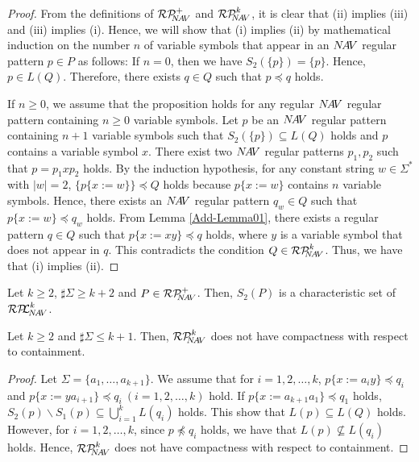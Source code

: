 \begin{proof}
From the definitions of $\mathcal{RP}^{+}_{\!\!\!N\!A\!V}$ and $\mathcal{RP}^{k}_{\!\!\!N\!A\!V}$, it is clear that (ii) implies (iii)  and  (iii) implies (i).
Hence, we will show that (i) implies (ii) 
by mathematical induction on the number $n$ of variable symbols that appear in an $N\!A\!V$ regular pattern $p\in P$ as follows:
If $n=0$, then we have $S_{2}(\{p\})= \{ p \}$.
Hence, $p \in L(Q)$.
Therefore, there exists $q \in Q$ such that $p \preceq q$ holds.

If $n \ge 0$, we assume that the proposition holds for any regular $N\!A\!V$ regular pattern containing $n \ge 0$ variable symbols.
Let $p$ be an $N\!A\!V$ regular pattern containing $n+1$ variable symbols such that $S_{2}(\{p\}) \subseteq L(Q)$ holds and $p$ contains a variable symbol $x$.
There exist two $N\!A\!V$ regular patterns $p_{1},p_{2}$ such that $p=p_{1}xp_{2}$ holds.
By the induction hypothesis, for any constant string $w\in \Sigma^{\ast}$ with $|w|=2$, $\{p\{x:=w\}\}\preceq Q$ holds because $p\{x:=w\}$ contains $n$ variable symbols.
Hence, there exists an $N\!A\!V$ regular pattern $q_{w} \in Q$ such that $p \{ x:=w \} \preceq q_{w}$ holds.
From Lemma \ref{Add-Lemma01}, %
there exists a regular pattern $q \in Q$ such that $p \{ x:=xy \} \preceq q$ holds, where $y$ is a variable symbol that does not appear in $q$.
This contradicts the condition $Q \in \mathcal{RP}^{k}_{\!\!\!N\!A\!V}$.
Thus, we have that (i) implies (ii).
\end{proof}

\begin{col}
Let $k\ge 2$, $\sharp\Sigma \ge k+2$ and $P \in \mathcal{RP}^{+}_{\!\!\!N\!A\!V}$.
Then, $S_{2}(P)$ is a characteristic set of $\mathcal{RP\!\!L}^{k}_{\!N\!A\!V}$.%
\end{col}

\begin{lem}\label{Case_k+2}%
Let $k\ge 2$ and $\sharp\Sigma \le k+1$.
Then, $\mathcal{RP}^{k}_{\!\!\!N\!A\!V}$ does not have compactness with respect to containment.
\end{lem}
\begin{proof}
Let $\Sigma = \{ a_{1}, \ldots , a_{k+1} \}$.
We assume that for $i=1,2,\ldots,k$, $p \{ x := a_{i}y \} \preceq q_{i}$ and $p \{ x := ya_{i+1} \} \preceq q_{i}~(i=1,2, \ldots ,k)$ hold.
If $p \{ x:= a_{k+1}a_{1} \} \preceq q_{1}$ holds, $S_{2}(p) \backslash S_{1}(p) \subseteq \bigcup^{k}_{i=1} L(q_{i})$ holds.
This show that $L(p) \subseteq L(Q)$ holds.
However, for $i=1,2,\ldots,k$, since $p \not \preceq q_{i}$ holds, we have that $L(p) \not \subseteq L(q_{i})$ holds.
Hence, $\mathcal{RP}^{k}_{\!\!\!N\!A\!V}$ does not have compactness with respect to containment.
\end{proof}

